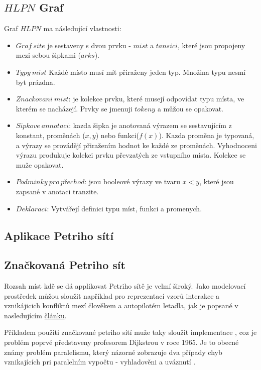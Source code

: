 \subsection{$HLPN$ Graf}
Graf $HLPN$ ma následující vlastnosti:
\begin{itemize}
  \item $Graf\:site$ je sestaveny s dvou prvku - $mist$ a $tansici$, které jsou propojeny mezi sebou šipkami ($arks$).
  \item $Typy\:mist$ Každé místo musí mít přiraženy jeden typ. Množina typu nesmí byt prázdna.
  \item $Znackovani\:mist$: je kolekce prvku, které musejí odpovídat typu místa, ve kterém se nacházejí. Prvky se jmenuji $tokeny$ a můžou se opakovat.
  \item $Sipkove\:annotaci$: kazda šipka je anotovaná výrazem se sestavujícím z konstant, proměnách ($x, y$) nebo funkci($f(x)$). Kazda proměna je typovaná, a výrazy se provádějí přiražením hodnot ke každé ze proměnách. Vyhodnoceni výrazu produkuje kolekci prvku převzatých ze vstupního místa. Kolekce se muže opakovat.
  \item $Podminky\:pro\:přechod$: jsou booleové výrazy ve tvaru $x < y$, které jsou zapsané v anotaci tranzite.
  \item $Deklaraci$: Vytvářejí definici typu míst, funkci a promenych.
\end{itemize}

\subsection{Aplikace Petriho sítí}

\subsection{Značkovaná Petriho sít}
Rozsah míst kdě se dá applikovat Petriho sítě je velmí široký. Jako modelovací prostředek můžou sloužit například pro reprezentací vzorů interakce a vznikájicich konfliktů mezí člověkem a autopilotém letadla, jak je popsané v nasledujícím \href{https://www-tandfonline-com.ezproxy.lib.vutbr.cz/doi/full/10.1080/00140139.2013.877597}{článku}.

Příkladem použiti značkované petriho sítí muže taky sloužit implementace  \cite[p.65--67]{PNandMoS}, coz je problém poprvé představeny profesorem Dijkstrou v roce 1965.
Je to obecné známy problém paralelismu, který názorné zobrazuje dva případy chyb vznikajících pri paralelním vypočtu - vyhladověni a uváznutí \cite{dining_philosophers}.

